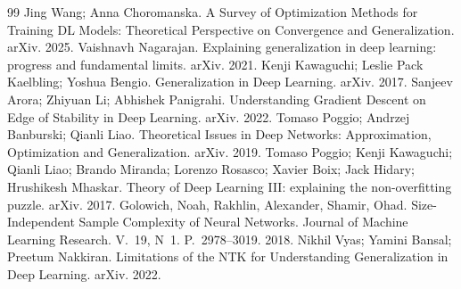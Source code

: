 \begin{thebibliography}{99}
 Jing Wang; Anna Choromanska. A Survey of Optimization Methods for Training DL Models: Theoretical Perspective on Convergence and Generalization. arXiv. 2025.
 Vaishnavh Nagarajan. Explaining generalization in deep learning: progress and fundamental limits. arXiv. 2021.
 Kenji Kawaguchi; Leslie Pack Kaelbling; Yoshua Bengio. Generalization in Deep Learning. arXiv. 2017.
 Sanjeev Arora; Zhiyuan Li; Abhishek Panigrahi. Understanding Gradient Descent on Edge of Stability in Deep Learning. arXiv. 2022.
 Tomaso Poggio; Andrzej Banburski; Qianli Liao. Theoretical Issues in Deep Networks: Approximation, Optimization and Generalization. arXiv. 2019.
 Tomaso Poggio; Kenji Kawaguchi; Qianli Liao; Brando Miranda; Lorenzo Rosasco; Xavier Boix; Jack Hidary; Hrushikesh Mhaskar. Theory of Deep Learning III: explaining the non-overfitting puzzle. arXiv. 2017.
 Golowich, Noah, Rakhlin, Alexander, Shamir, Ohad. Size-Independent Sample Complexity of Neural Networks. Journal of Machine Learning Research. V.~19, N~1. P.~2978--3019. 2018.
 Nikhil Vyas; Yamini Bansal; Preetum Nakkiran. Limitations of the NTK for Understanding Generalization in Deep Learning. arXiv. 2022.
\end{thebibliography}

